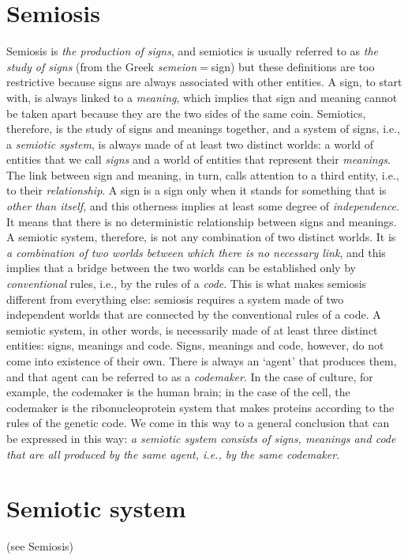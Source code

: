 \documentclass[12pt]{article}
\begin{document}
\section{Semiosis}
Semiosis is \textit{the production of signs}, and semiotics is usually referred to as \textit{the study of signs} (from the Greek \textit{semeion}$=$sign) but these definitions are too restrictive because signs are always associated with other entities. A sign, to start with, is always linked to a \textit{meaning}, which implies that sign and meaning cannot be taken apart because they are the two sides of the same coin. Semiotics, therefore, is the study of signs and meanings together, and a system of signs, i.e., a \textit{semiotic system}, is always made of at least two distinct worlds: a world of entities that we call \textit{signs} and a world of entities that represent their \textit{meanings}. The link between sign and meaning, in turn, calls attention to a third entity, i.e., to their \textit{relationship}. A sign is a sign only when it stands for something that is \textit{other than itself}, and this otherness implies at least some degree of \textit{independence}. It means that there is no deterministic relationship between signs and meanings. A semiotic system, therefore, is not any combination of two distinct worlds. It is \textit{a combination of two worlds between which there is no necessary link}, and this implies that a bridge between the two worlds can be established only by \textit{conventional} rules, i.e., by the rules of a \textit{code}. This is what makes semiosis different from everything else: semiosis requires a system made of two independent worlds that are connected by the conventional rules of a code. A semiotic system, in other words, is necessarily made of at least three distinct entities: signs, meanings and code. Signs, meanings and code, however, do not come into existence of their own. There is always an `agent' that produces them, and that agent can be referred to as a \textit{codemaker}. In the case of culture, for example, the codemaker is the human brain; in the case of the cell, the codemaker is the ribonucleoprotein system that makes proteins according to the rules of the genetic code. We come in this way to a general conclusion that can be expressed in this way: \textit{a semiotic system consists of signs, meanings and code that are all produced by the same agent, i.e., by the same codemaker}.


\section{Semiotic system} (see Semiosis)
\end{document}
